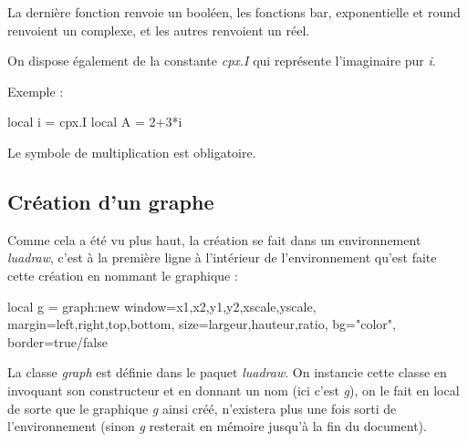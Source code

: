\documentclass[%
10pt,%
a4paper,%
french,%
]%
{article}%
\begin{document}
La dernière fonction renvoie un booléen, les fonctions bar, exponentielle et round renvoient un complexe, et les autres renvoient un réel.

On dispose également de la constante \emph{cpx.I} qui représente l'imaginaire pur \emph{i}. 

Exemple :

\begin{Luacode}
local i = cpx.I
local A = 2+3*i
\end{Luacode}

Le symbole de multiplication est obligatoire.

\subsection{Création d'un graphe}

Comme cela a été vu plus haut, la création se fait dans un environnement \emph{luadraw}, c'est à la première ligne à l'intérieur de l'environnement qu'est faite cette création en nommant le graphique :

\begin{Luacode}
local g = graph:new{ window={x1,x2,y1,y2,xscale,yscale}, margin={left,right,top,bottom}, 
                     size={largeur,hauteur,ratio}, bg="color", border=true/false }
\end{Luacode}

La classe \emph{graph} est définie dans le paquet \emph{luadraw}. On instancie cette classe en invoquant son constructeur et en donnant un nom (ici c'est \emph{g}), on le fait en local de sorte que le graphique \emph{g} ainsi créé, n'existera plus une fois sorti de l'environnement (sinon \emph{g} resterait en mémoire jusqu'à la fin du document).
\end{document}

